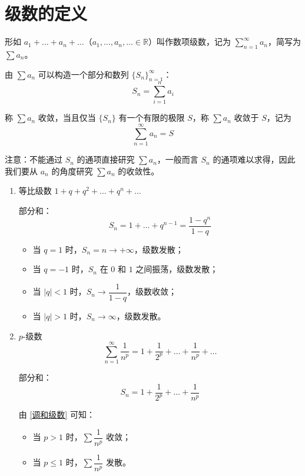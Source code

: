 \section{级数的定义}
\begin{definition}
	形如 $a_1 + \dots + a_n + \dots$（$a_1, \dots, a_n, \dots \in \mathbb{R}$）叫作数项级数，记为 $\sum\limits_{n=1}^{\infty} a_n$，简写为 $\sum a_n$。
	
	由 $\sum a_n$ 可以构造一个部分和数列 $\{S_n\}_{n=1}^{\infty}$：
	\[
	S_n = \sum_{i=1}^{n} a_i
	\]
	
	称 $\sum a_n$ 收敛，当且仅当 $\{S_n\}$ 有一个有限的极限 $S$，称 $\sum a_n$ 收敛于 $S$，记为
	\[
	\sum_{n=1}^{\infty} a_n = S
	\]
	
\end{definition}

注意：不能通过 $S_n$ 的通项直接研究 $\sum a_n$，一般而言 $S_n$ 的通项难以求得，因此我们要从 $a_n$ 的角度研究 $\sum a_n$ 的收敛性。


\begin{example}
	\begin{enumerate}
		\item 等比级数 $1 + q + q^2 + \dots + q^n + \dots$
		
		部分和：
		\[
		S_n = 1 + \dots + q^{n-1} = \frac{1 - q^n}{1 - q}
		\]
		\begin{itemize}
			\item 当 $q = 1$ 时，$S_n = n \to +\infty$，级数发散；
			\item 当 $q = -1$ 时，$S_n$ 在 $0$ 和 $1$ 之间振荡，级数发散；
			\item 当 $|q| < 1$ 时，$S_n \to \dfrac{1}{1-q}$，级数收敛；
			\item 当 $|q| > 1$ 时，$S_n \to \infty$，级数发散。
		\end{itemize}
		\item $p$-级数
		\[
		\sum_{n=1}^{\infty} \frac{1}{n^p} = 1 + \frac{1}{2^p} + \dots + \frac{1}{n^p} + \dots
		\]
		
		部分和：
		\[
		S_n = 1 + \frac{1}{2^p} + \dots + \frac{1}{n^p}
		\]
		
		由 \ref{调和级数} 可知：
		\begin{itemize}
			\item 当 $p > 1$ 时，$\sum \dfrac{1}{n^p}$ 收敛；
			\item 当 $p \le 1$ 时，$\sum \dfrac{1}{n^p}$ 发散。
		\end{itemize}

	\end{enumerate}

\end{example}

